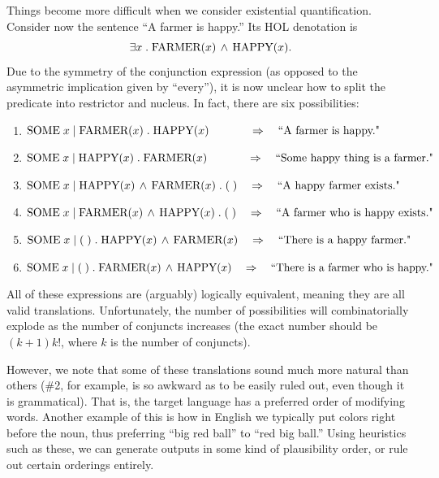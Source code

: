 \documentclass[11pt, oneside]{article}      %
\begin{document}
Things become more difficult when we consider existential quantification.  Consider now the sentence ``A farmer is happy.''  Its HOL denotation is
$$
\exists x \; . \; \textnormal{FARMER}(x) \, \wedge \, \textnormal{HAPPY}(x).
$$
Due to the symmetry of the conjunction expression (as opposed to the asymmetric implication given by ``every''), it is now unclear how to split the predicate into restrictor and nucleus.  In fact, there are six possibilities:
\begin{enumerate}
\item $\textnormal{SOME} \; x \; | \; \textnormal{FARMER}(x) \; . \; \textnormal{HAPPY}(x) \quad \quad \quad \; \; \Rightarrow \quad \textnormal{``A farmer is happy."}$ 
\item $\textnormal{SOME} \; x \; | \; \textnormal{HAPPY}(x) \; . \; \textnormal{FARMER}(x) \quad \quad \quad \; \; \Rightarrow \quad \textnormal{``Some happy thing is a farmer."}$
\item $\textnormal{SOME} \; x \; | \; \textnormal{HAPPY}(x) \, \wedge \, \textnormal{FARMER}(x) \; . \; ( \; ) \quad \Rightarrow \quad \textnormal{``A happy farmer exists."}$
\item $\textnormal{SOME} \; x \; | \; \textnormal{FARMER}(x) \, \wedge \, \textnormal{HAPPY}(x) \; . \; ( \; ) \quad \Rightarrow \quad \textnormal{``A farmer who is happy exists."}$
\item $\textnormal{SOME} \; x \; | \; ( \; ) \; . \; \textnormal{HAPPY}(x) \, \wedge \, \textnormal{FARMER}(x) \quad \Rightarrow \quad \textnormal{``There is a happy farmer."}$
\item $\textnormal{SOME} \; x \; | \; ( \; ) \; . \; \textnormal{FARMER}(x) \, \wedge \, \textnormal{HAPPY}(x) \quad \Rightarrow \quad \textnormal{``There is a farmer who is happy."}$
\end{enumerate}
All of these expressions are (arguably) logically equivalent, meaning they are all valid translations.  Unfortunately, the number of possibilities will combinatorially explode as the number of conjuncts increases (the exact number should be $(k + 1) k!$, where $k$ is the number of conjuncts).

However, we note that some of these translations sound much more natural than others (\#2, for example, is so awkward as to be easily ruled out, even though it is grammatical).  That is, the target language has a preferred order of modifying words.  Another example of this is how in English we typically put colors right before the noun, thus preferring ``big red ball'' to ``red big ball.''  Using heuristics such as these, we can generate outputs in some kind of plausibility order, or rule out certain orderings entirely.  
\end{document}
